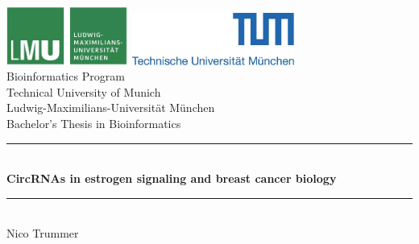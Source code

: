 \documentclass[pdftex,12pt,a4paper]{report}
\newcommand{\HRule}{\rule{\linewidth}{0.5mm}}
\begin{document}
\begin{titlepage}

    \sffamily

    \begin{center}

        \includegraphics[width=0.3\textwidth]{logo2.png}
        \hfill
        \includegraphics[width=0.4\textwidth]{logo1.png}
        \\[5cm]

        {\Large Bioinformatics Program}\\[0.5cm]
        {\Large Technical University of Munich}\\[0.5cm]
        {\Large Ludwig-Maximilians-Universit\"at M\"unchen}\\[2cm]
        {\Large Bachelor's Thesis in Bioinformatics}\\[1.5cm]

        \HRule \\[0.4cm]
        { \huge \bfseries CircRNAs in estrogen signaling and breast cancer
        biology}\\[0.4cm]

        \HRule \\[1.5cm]

        {\Large Nico Trummer}\\[2.5cm]

        \vfill
    \end{center}
\end{titlepage}
\pagestyle{empty}
\end{document}

